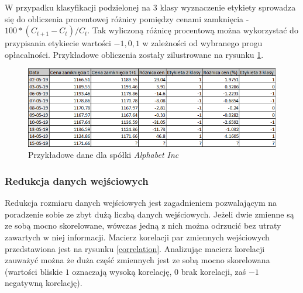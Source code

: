 \documentclass[a4paper, twoside, 11pt, openright]{article}
\begin{document}
 W przypadku klasyfikacji podzielonej na 3 klasy wyznaczenie etykiety sprowadza się do obliczenia procentowej różnicy pomiędzy cenami zamknięcia - $100*(C_{t+1}-C_t)/C_t$. Tak wyliczoną różnicę procentową można wykorzystać do przypisania etykiecie wartości $-1, 0, 1$ w zależności od wybranego progu opłacalności. Przykładowe obliczenia zostały zilustrowane na rysunku \ref{classification_label_creation}.

\begin{figure}[H]
\centering 
\includegraphics[scale=0.9]{img/label_creation3.png}
\caption{Przykładowe dane dla spółki \textit{Alphabet Inc}}
\label{classification_label_creation}
\end{figure}


\subsubsection{Redukcja danych wejściowych}

Redukcja rozmiaru danych wejściowych jest zagadnieniem pozwalającym na poradzenie sobie ze zbyt dużą liczbą danych wejściowych. Jeżeli dwie zmienne są ze sobą mocno skorelowane, wówczas jedną z nich można odrzucić bez utraty zawartych w niej informacji. Macierz korelacji par zmiennych wejściowych przedstawiona jest na rysunku \ref{correlation}. Analizując macierz korelacji zauważyć można że duża część zmiennych jest ze sobą mocno skorelowana (wartości bliskie $1$ oznaczają wysoką korelację, 0 brak korelacji, zaś $-1$ negatywną korelację).
\end{document}
